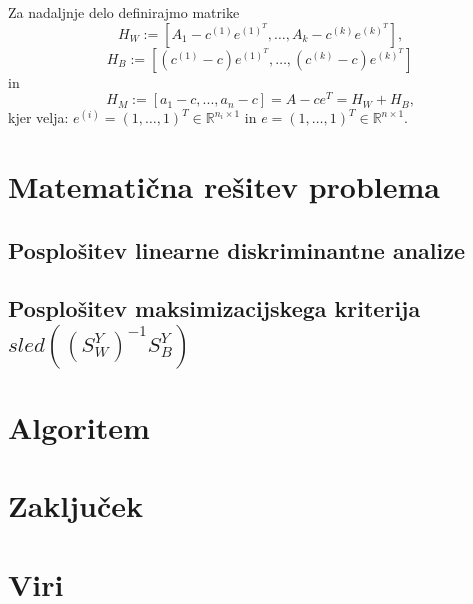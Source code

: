 \documentclass[mat1]{article}
\begin{document}
Za nadaljnje delo definirajmo matrike
$$H_W := [A_1 - c^{(1)}e^{(1)^T}, \ldots, A_k - c^{(k)}e^{(k)^T}] \text{,}$$
$$H_B := [(c^{(1)} - c)e^{(1)^T}, \ldots,(c^{(k)} - c) e^{(k)^T}]$$
in
$$H_M := [a_1 - c, ..., a_n - c] = A - ce^T = H_W + H_B\text{,}$$
kjer velja:
$e^{(i)} = (1,\ldots, 1) ^T \in \mathbb{R}^{ n_i \times 1 }$ in $e =  (1,\ldots, 1) ^T \in \mathbb{R}^{ n \times 1 }$.

\section{Matematična rešitev problema}
\subsection{Posplošitev linearne diskriminantne analize}

\subsection{Posplošitev maksimizacijskega kriterija $sled((S_W^Y)^{-1}S_B^Y)$}

\section{Algoritem}

\section{Zaključek}

\section{Viri}
\end{document}
